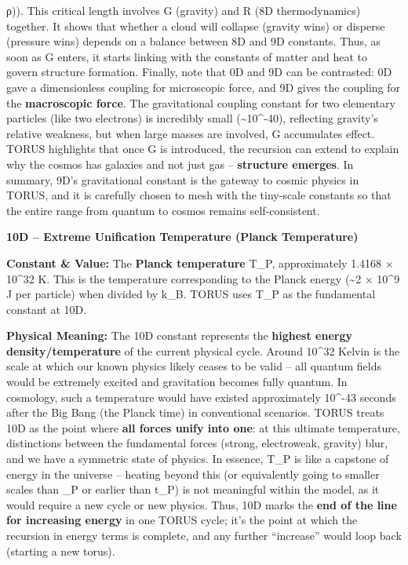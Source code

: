 \documentclass[
]{article}
\begin{document}
ρ)). This critical length involves G (gravity) and R (8D thermodynamics)
together\hspace{0pt}. It shows that whether a cloud will collapse
(gravity wins) or disperse (pressure wins) depends on a balance between
8D and 9D constants. Thus, as soon as G enters, it starts linking with
the constants of matter and heat to govern structure formation. Finally,
note that 0D and 9D can be contrasted: 0D gave a dimensionless coupling
for microscopic force, and 9D gives the coupling for the
\textbf{macroscopic force}. The gravitational coupling constant for two
elementary particles (like two electrons) is incredibly small
(\textasciitilde10\^{}-40), reflecting gravity's relative weakness, but
when large masses are involved, G accumulates effect. TORUS highlights
that once G is introduced, the recursion can extend to explain why the
cosmos has galaxies and not just gas -- \textbf{structure emerges}. In
summary, 9D's gravitational constant is the gateway to cosmic physics in
TORUS, and it is carefully chosen to mesh with the tiny-scale constants
so that the entire range from quantum to cosmos remains self-consistent.

\textbf{10D -- Extreme Unification Temperature (Planck Temperature)}

\textbf{Constant \& Value:} The \textbf{Planck temperature} T\_P,
approximately 1.4168 × 10\^{}32 K\hspace{0pt}. This is the temperature
corresponding to the Planck energy (\textasciitilde2 × 10\^{}9 J per
particle) when divided by k\_B. TORUS uses T\_P as the fundamental
constant at 10D.

\textbf{Physical Meaning:} The 10D constant represents the
\textbf{highest energy density/temperature} of the current physical
cycle. Around 10\^{}32 Kelvin is the scale at which our known physics
likely ceases to be valid -- all quantum fields would be extremely
excited and gravitation becomes fully quantum. In cosmology, such a
temperature would have existed approximately 10\^{}-43 seconds after the
Big Bang (the Planck time) in conventional scenarios. TORUS treats 10D
as the point where \textbf{all forces unify into one}: at this ultimate
temperature, distinctions between the fundamental forces (strong,
electroweak, gravity) blur, and we have a symmetric state of
physics\hspace{0pt}. In essence, T\_P is like a capstone of energy in
the universe -- heating beyond this (or equivalently going to smaller
scales than \ell\_P or earlier than t\_P) is not meaningful within the
model, as it would require a new cycle or new physics. Thus, 10D marks
the \textbf{end of the line for increasing energy} in one TORUS cycle;
it's the point at which the recursion in energy terms is complete, and
any further ``increase'' would loop back (starting a new torus).
\end{document}
